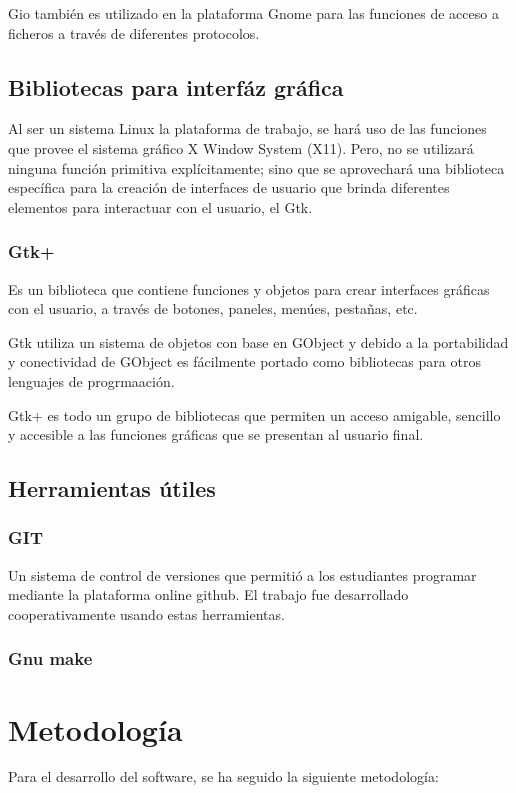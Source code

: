 \documentclass[letterpaper,10pt]{article}
\begin{document}
Gio también es utilizado en la plataforma Gnome para las funciones de acceso a ficheros 
a través de diferentes protocolos.

\subsection{Bibliotecas para interfáz gráfica}
Al ser un sistema Linux la plataforma de trabajo, se hará uso de las funciones que provee
el sistema gráfico X Window System (X11). Pero, no se utilizará ninguna función primitiva 
explícitamente; sino que se aprovechará una biblioteca específica para la creación de interfaces 
de usuario que brinda diferentes elementos para interactuar con el usuario, el Gtk.

\subsubsection{Gtk+}
Es un biblioteca que contiene funciones y objetos para crear interfaces gráficas con el usuario,
a través de botones, paneles, menúes, pestañas, etc.

Gtk utiliza un sistema de objetos con base en GObject y debido a la portabilidad y conectividad 
de GObject es fácilmente portado como bibliotecas para otros lenguajes de progrmaación.

Gtk+ es todo un grupo de bibliotecas que permiten un acceso amigable, sencillo y accesible 
a las funciones gráficas que se presentan al usuario final.

\subsection{Herramientas útiles}
\subsubsection{GIT}
Un sistema de control de versiones que permitió a los estudiantes programar mediante 
la plataforma online github. El trabajo fue desarrollado cooperativamente usando estas herramientas.

\subsubsection{Gnu make}

\section{Metodología}
Para el desarrollo del software, se ha seguido la siguiente metodología:
\end{document}
